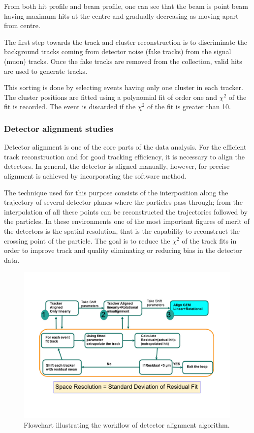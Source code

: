 From both hit profile and beam profile, one can see that the beam is point beam having maximum hits at the centre and gradually decreasing as moving apart from centre.

The first step towards the track and cluster reconstruction is to discriminate the background tracks coming from detector noise (fake tracks) from the signal (muon) tracks. Once the fake tracks are removed from the collection, valid hits are used to generate tracks.

This sorting is done by selecting events having only one cluster in each tracker. The cluster positions are fitted using a polynomial fit of order one and $\chi^2$ of the fit is recorded.
The event is discarded if the $\chi^2$ of the fit is greater than 10.

\subsubsection{Detector alignment studies}
Detector alignment is one of the core parts of the data analysis. 
For the efficient track reconstruction and for good tracking efficiency, it is necessary to align the detectors.
In general, the detector is aligned manually, however, for precise alignment is achieved by incorporating the software method.

The technique used for this purpose consists of the interposition along the trajectory of several detector planes where the particles pass through; from the interpolation of all these points can be reconstructed the trajectories followed by the particles.
In these environments one of the most important figures of merit of the detectors is the spatial resolution, that is the capability to reconstruct the crossing point of the particle.
The goal is to reduce the $\chi^{2}$ of the track fits in order to improve track and quality eliminating or reducing bias in the detector data.
\begin{figure}[htbp]
    \centering
    \includegraphics[width=0.99\textwidth]{figures/GEM/GEM_Alignment_FlowChart.pdf}
    \caption{Flowchart illustrating the workflow of detector alignment algorithm.}
    \label{fig:alignment}
\end{figure}

